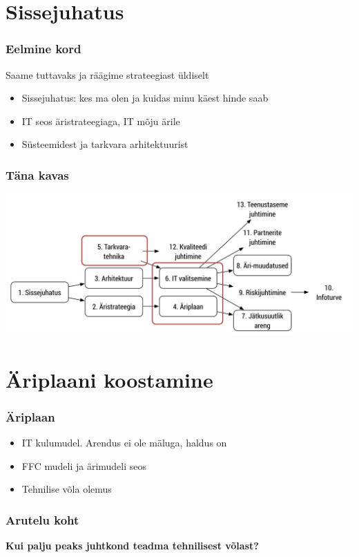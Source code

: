 


\maketitle

\section{Sissejuhatus}
\begin{frame}[fragile]
  \frametitle{Eelmine kord}
  Saame tuttavaks ja räägime strateegiast üldiselt
	\begin{itemize}
		\item Sissejuhatus: kes ma olen ja kuidas minu käest hinde saab
		\item IT seos äristrateegiaga, IT mõju ärile
		\item Süsteemidest ja tarkvara arhitektuurist
	\end{itemize}
\end{frame}

\begin{frame}[fragile]
  \frametitle{Täna kavas}
		\includegraphics[width=\textwidth]{aine_struktuur_teine.pdf}
\end{frame}

\section{Äriplaani koostamine}
\begin{frame}[fragile]
  \frametitle{Äriplaan}
	\begin{itemize}
		\item IT kulumudel. Arendus ei ole mäluga, haldus on
		\item FFC mudeli ja ärimudeli seos
		\item Tehnilise võla olemus
	\end{itemize}
\end{frame}


\begin{frame}[fragile]
  \frametitle{Arutelu koht}
		\begin{center}
			\textbf{Kui palju peaks juhtkond teadma tehnilisest võlast?}
		\end{center}
\end{frame}

